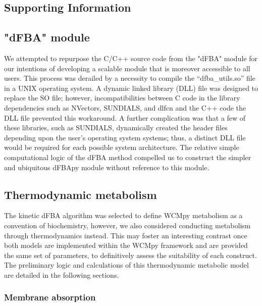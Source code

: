 
\begin{supplementary}

\section{Supporting Information}

\subsection{"dFBA" module}
We attempted to repurpose the C/C++ source code from the "dFBA" module for our intentions of developing a scalable module that is moreover accessible to all users. This process was derailed by a necessity to compile the “dfba\_utils.so” file in a UNIX operating system. A dynamic linked library (DLL) file was designed to replace the SO file; however, incompatibilities between C code in the library dependencies such as NVectors, SUNDIALS, and dlfcn and the C++ code the DLL file prevented this workaround. A further complication was that a few of these libraries, such as SUNDIALS, dynamically created the header files depending upon the user’s operating system systems; thus, a distinct DLL file would be required for each possible system architecture. The relative simple computational logic of the dFBA method compelled us to construct the simpler and ubiquitous dFBApy module without reference to this module. 

\subsection{Thermodynamic metabolism}
The kinetic dFBA algorithm was selected to define WCMpy metabolism as a convention of biochemistry, however, we also considered conducting metabolism through thermodynamics instead. This may foster an interesting contrast once both models are implemented within the WCMpy framework and are provided the same set of parameters, to definitively assess the suitability of each construct. The preliminary logic and calculations of this thermodynamic metabolic model are detailed in the following sections. 

\subsubsection{Membrane absorption}


\end{supplementary}
